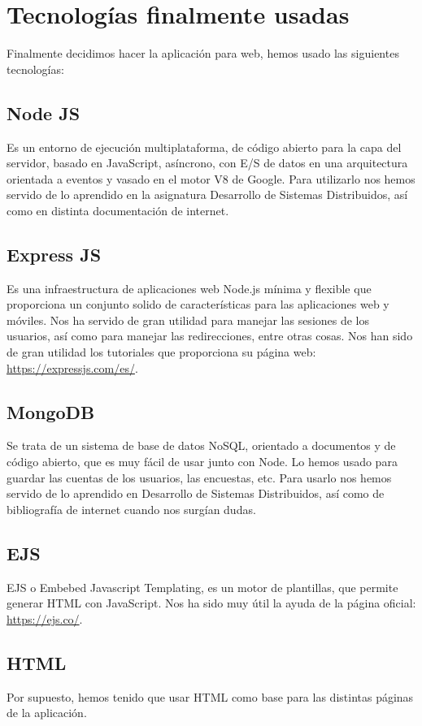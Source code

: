 \documentclass{article}
\begin{document}
 	\section{Tecnologías finalmente usadas}
 	Finalmente decidimos hacer la aplicación para web, hemos usado las siguientes tecnologías:
 	\subsection{Node JS}
 	Es un entorno de ejecución multiplataforma, de código abierto para la capa del servidor, basado en JavaScript, asíncrono, con E/S de datos en una arquitectura orientada a eventos y vasado en el motor V8 de Google. Para utilizarlo nos hemos servido de lo aprendido en la asignatura Desarrollo de Sistemas Distribuidos, así como en distinta documentación de internet.
 	\subsection{Express JS}
 	Es una infraestructura de aplicaciones web Node.js mínima y flexible que proporciona un conjunto solido de características para las aplicaciones web y móviles. Nos ha servido de gran utilidad para manejar las sesiones de los usuarios, así como para manejar las redirecciones, entre otras cosas. Nos han sido de gran utilidad los tutoriales que proporciona su página web: \url{https://expressjs.com/es/}.
 	\subsection{MongoDB}
 	Se trata de un sistema de base de datos NoSQL, orientado a documentos y de código abierto, que es muy fácil de usar junto con Node. Lo hemos usado para guardar las cuentas de los usuarios, las encuestas, etc. Para usarlo nos hemos servido de lo aprendido en Desarrollo de Sistemas Distribuidos, así como de bibliografía de internet cuando nos surgían dudas.
 	\subsection{EJS}
 	EJS o Embebed Javascript Templating, es un motor de plantillas, que permite generar HTML con JavaScript. Nos ha sido muy útil la ayuda de la página oficial: \url{https://ejs.co/}.
 	\subsection{HTML}
 	Por supuesto, hemos tenido que usar HTML como base para las distintas páginas de la aplicación.
\end{document}

